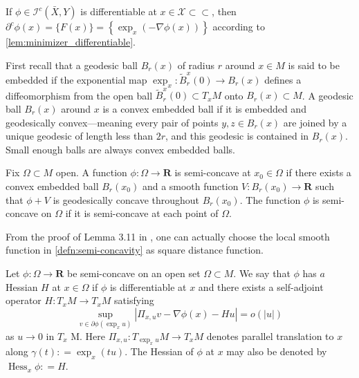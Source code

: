 \begin{example} 
	\label{example:minimizer_differentiable}
	If \( \phi \in \mathcal { I } ^ { c } ( \bar { X } , Y ) \) is differentiable at
	\( x \in \mathcal { X } \subset \subset \),
	then \( \partial ^ { c } \phi ( x ) = \{ F ( x ) \} = \left\{ \exp _ { x } ( - \nabla \phi ( x ) ) \right\} \) according to \cref{lem:minimizer_differentiable}.
\end{example}

First recall that a geodesic ball \( B _ { r } ( x ) \) of radius \( r \) around \( x \in M \) is said to be embedded if the exponential map \( \exp _ { x } : \tilde { B } _ { r } ^ { x } ( 0 ) \rightarrow B _ { r } ( x ) \) defines a diffeomorphism from the open ball \( \tilde { B } _ { r } ^ { x } ( 0 ) \subset T _ { x } M \) onto \( B _ { r } ( x ) \subset M \).
A geodesic ball \( B _ { r } ( x ) \) around \( x \) is a convex embedded ball if it is embedded and geodesically convex---meaning every pair of points \( y , z \in B _ { r } ( x ) \) are joined by a unique geodesic of length less than \( 2 r \), and this geodesic is contained in \( B _ { r } ( x )\).
Small enough balls are always convex embedded balls.

\begin{defn}
	\label{defn:semi-concavity}
	Fix \( \Omega \subset M \) open. A function \( \phi : \Omega \rightarrow \mathbf { R } \) is semi-concave at \( x _ { 0 } \in \Omega \) if there exists a convex embedded ball \( B _ { r } \left( x _ { 0 } \right) \) and a smooth function \( V : B _ { r } \left( x _ { 0 } \right) \rightarrow \mathbf { R } \) such that \( \phi + V \) is geodesically concave throughout \( B _ { r } \left( x _ { 0 } \right) . \) The function \( \phi \) is semi-concave on \( \Omega \) if it is semi-concave at each point of \( \Omega \).
\end{defn}

From the proof of Lemma 3.11 in \cite{cordero2001riemannian}, one can actually choose the local smooth function in \cref{defn:semi-concavity} as square distance function.

\begin{defn}[Hessian]
	Let \( \phi : \Omega \rightarrow \mathbf { R } \) be semi-concave on an open set \( \Omega \subset M . \) We say that \( \phi \) has \( a \) Hessian \( H \) at \( x \in \Omega \) if \( \phi \) is differentiable at \( x \)
	and there exists a self-adjoint operator \( H : T _ { x } M \rightarrow T _ { x } M \) satisfying
	\begin{equation}
		\label{defn:hessian}
		\sup _ { v \in \partial \phi \left( \exp _ { x } u \right) } \left| \Pi _ { x , u } v - \nabla \phi ( x ) - H u \right| = o ( | u | )
	\end{equation}
	as \( u \rightarrow 0 \) in \( T _ { x } \) M. Here \( \Pi _ { x , u } : T _ { \exp _ { x } u } M \rightarrow T _ { x } M \) denotes parallel translation to \( x \) along \( \gamma ( t ) : = \exp _ { x } ( t u ) . \) The Hessian of \( \phi \) at \( x \) may also be denoted
	by \( \operatorname { Hess } _ { x } \phi : = H \).
\end{defn}

